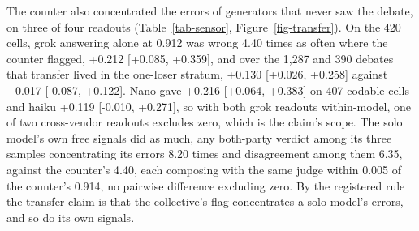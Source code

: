 The counter also concentrated the errors of generators that never saw the
debate, on three of four readouts (Table~\ref{tab-sensor},
Figure~\ref{fig-transfer}). On the 420 cells, grok answering alone at
0.912 was wrong 4.40 times as often where the counter flagged,
+0.212 [+0.085, +0.359], %
and over the 1,287 and 390 debates that transfer lived in the one-loser
stratum, +0.130 [+0.026, +0.258] against +0.017 [-0.087, +0.122].
Nano gave +0.216 [+0.064, +0.383] on 407 codable cells and haiku +0.119
[-0.010, +0.271], so with both grok readouts within-model, one of two
cross-vendor readouts excludes zero, which is the claim's scope.
The solo model's own free signals did as much, any both-party verdict
among its three samples concentrating its errors 8.20 times and
disagreement among them 6.35, against the counter's 4.40, each composing
with the same judge within 0.005 of the counter's 0.914, no pairwise
difference excluding zero.
By the registered rule the transfer claim is that the collective's flag
concentrates a solo model's errors, and so do its own signals.

